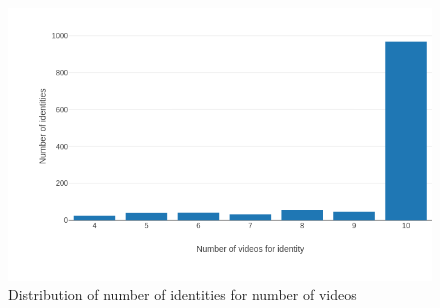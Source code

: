 \begin{figure}[h!]
    \centering
    \includegraphics[scale=0.4]{figures/identities_per_num_of_videos.png}
    \caption{Distribution of number of identities for number of videos} 
    \label{fig:num_of_videos_per_id}
\end{figure}



